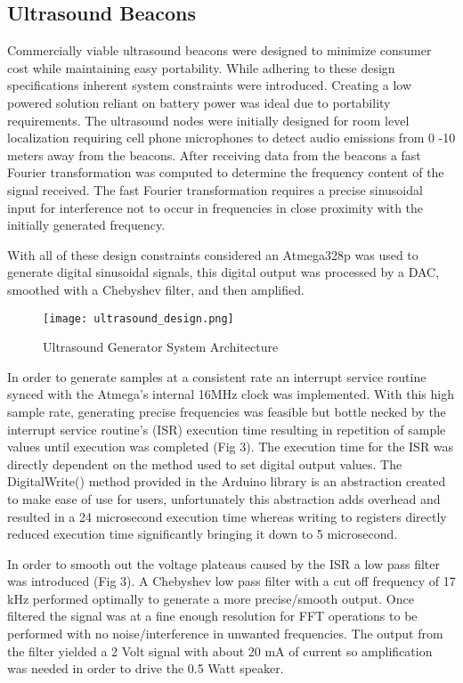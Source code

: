 \subsection{Ultrasound Beacons}
\label{sec:ultrasound-beacons}


	Commercially viable ultrasound beacons were designed to minimize consumer cost while maintaining easy portability.  While adhering to these design specifications inherent system constraints were introduced. Creating a low powered solution reliant on battery power was ideal due to portability requirements.  The ultrasound nodes were initially designed for room level localization requiring cell phone microphones to detect audio emissions from 0 -10 meters away from the beacons. After receiving data from the beacons a fast Fourier transformation was computed to determine the frequency content of the signal received.  The fast Fourier transformation requires a precise sinusoidal input for interference not to occur in frequencies in close proximity with the initially generated frequency.  

	With all of these design constraints considered an Atmega328p was used to generate digital sinusoidal signals, this digital output was processed by a DAC, smoothed with a Chebyshev filter, and then amplified.  
 
\begin{figure}[h]
  \centering
  \texttt{[image: ultrasound\_design.png]}
  \caption{Ultrasound Generator System Architecture}
  \label{fig:ultrasound_design}
\end{figure}


	In order to generate samples at a consistent rate an interrupt service routine synced with the Atmega’s internal 16MHz clock was implemented. With this high sample rate,  generating precise frequencies was feasible but bottle necked by the interrupt service routine's (ISR) execution time resulting in repetition of sample values until execution was completed  (Fig  3). The execution time for the ISR was directly dependent on the method used to set digital output values. The DigitalWrite() method provided in the Arduino library is an abstraction created to make ease of use for users, unfortunately this abstraction adds overhead and resulted in a 24 microsecond execution time whereas writing to registers directly reduced execution time significantly bringing it down to 5 microsecond.  

	In order to smooth out the voltage plateaus caused by the ISR a low pass filter was introduced (Fig 3). A Chebyshev low pass filter with a cut off frequency of 17 kHz performed optimally to generate a more precise/smooth output.  Once filtered the signal was at a fine enough resolution for FFT operations to be performed with no noise/interference in unwanted frequencies.  The output from the filter yielded a 2 Volt signal with about 20 mA of current so amplification was needed in order to drive the 0.5 Watt speaker. 

